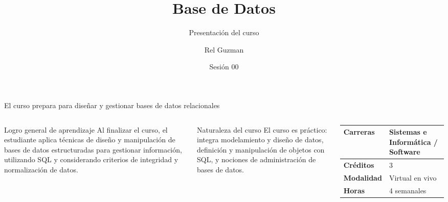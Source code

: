 \documentclass[aspectratio=169,10pt,c]{beamer}
\title{Base de Datos}
\subtitle{Presentación del curso}
\date{Sesión 00}
\author{Rel Guzman}
\begin{document}
{\maketitle}

\begin{frame}{El curso prepara para diseñar y gestionar bases de datos relacionales}
\begin{columns}[c,onlytextwidth]
\begin{block}{Logro general de aprendizaje}
\small Al finalizar el curso, el estudiante aplica técnicas de diseño y manipulación de bases de datos estructuradas para gestionar información, utilizando SQL y considerando criterios de integridad y normalización de datos.
\end{block}
\begin{exampleblock}{Naturaleza del curso}
\small El curso es práctico: integra modelamiento y diseño de datos, definición y manipulación de objetos con SQL, y nociones de administración de bases de datos.
\end{exampleblock}
\small
\begin{tabular}{>{\bfseries}p{1.65cm}p{3.0cm}}
\toprule
Carreras & Sistemas e Informática / Software\\
\midrule
Créditos & 3\\
Modalidad & Virtual en vivo\\
Horas & 4 semanales\\
\bottomrule
\end{tabular}
\end{columns}
\end{frame}
\end{document}

